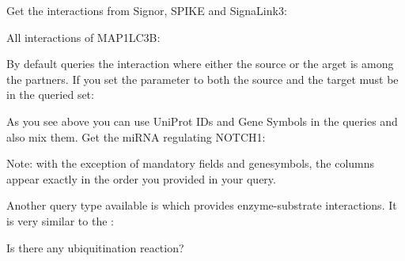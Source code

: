 \documentclass[letterpaper,10pt,english]{sphinxmanual}
\begin{document}
Get the interactions from Signor, SPIKE and SignaLink3:
\begin{quote}

\end{quote}

All interactions of MAP1LC3B:
\begin{quote}

\end{quote}

By default  queries the interaction where either the source or the
arget is among the partners. If you set the  parameter to
 both the source and the target must be in the queried set:
\begin{quote}

\end{quote}

As you see above you can use UniProt IDs and Gene Symbols in the queries and
also mix them. Get the miRNA regulating NOTCH1:
\begin{quote}

\end{quote}

Note: with the exception of mandatory fields and genesymbols, the columns
appear exactly in the order you provided in your query.

Another query type available is  which provides enzyme-substrate
interactions. It is very similar to the :
\begin{quote}

\end{quote}

Is there any ubiquitination reaction?
\begin{quote}

\end{quote}
\end{document}
